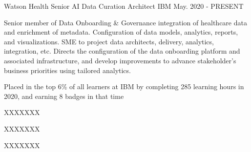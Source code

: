 

\begin{cventries}

  \cventry
    {Watson Health} %
    {Senior AI Data Curation Architect} %
    {IBM} %
    {May. 2020 - PRESENT} %
    {
      \begin{cvparagraph}
        Senior member of Data Onboarding \& Governance integration of healthcare data and enrichment of metadata. Configuration of data models, analytics, reports, and visualizations. SME to project data architects, delivery, analytics, integration, etc. Directs the configuration of the data onboarding platform and associated infrastructure, and develop improvements to advance stakeholder’s business priorities using tailored analytics.
      \end{cvparagraph}
      \begin{cvitems} %
        \item {Placed in the top 6\% of all learners at IBM by completing 285 learning hours in 2020, and earning 8 badges in that time}
        \item {XXXXXXX}
        \item {XXXXXXX}
        \item {XXXXXXX}
      \end{cvitems}
    }


\end{cventries}
